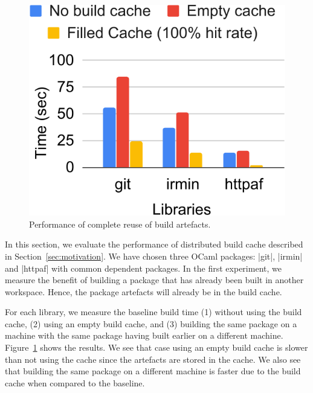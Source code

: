 \begin{figure}
	\vspace{-1cm}
	\centering
	\includegraphics[scale=0.5]{results/build1}
	\caption{Performance of complete reuse of build artefacts.}
	\label{res:build1}
	\vspace{-0.5cm}
\end{figure}
In this section, we evaluate the performance of distributed build cache
described in Section~\ref{sec:motivation}. We have chosen three OCaml packages:
|git|, |irmin| and |httpaf| with common dependent packages. In the first
experiment, we measure the benefit of building a package that has already been
built in another workspace. Hence, the package artefacts will already be in the
build cache.

For each library, we measure the
baseline build time (1) without using the build cache, (2) using an empty build
cache, and (3) building the same package on a machine with the same package
having built earlier on a different machine. Figure~\ref{res:build1} shows the
results. We see that case using an empty build cache is slower than not using
the cache since the artefacts are stored in the cache. We also see that
building the same package on a different machine is faster due to the build
cache when compared to the baseline.

